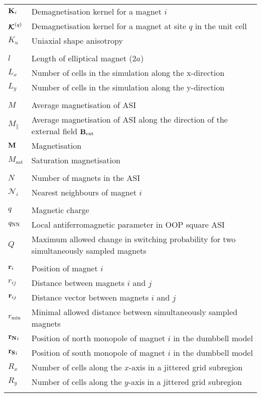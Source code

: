 \begin{longtable}[l]{p{60pt} p{350pt}}
	$\boldsymbol{\mathbf{K}}_i$ & Demagnetisation kernel for a magnet $i$ \\
	$\boldsymbol{\mathbf{\mathcal{K}}}^{(q)}$ & Demagnetisation kernel for a magnet at site $q$ in the unit cell \\
	$K_u$ & Uniaxial shape anisotropy \\
	&\\

	$l$ & Length of elliptical magnet ($2a$) \\
	$L_x$ & Number of cells in the simulation along the x-direction \\
	$L_y$ & Number of cells in the simulation along the y-direction \\
	&\\

	$M$ & Average magnetisation of ASI \\
	$M_\parallel$ & Average magnetisation of ASI along the direction of the external field $\boldsymbol{\mathbf{B}}_\mathrm{ext}$ \\
	$\boldsymbol{\mathbf{M}}$ & Magnetisation \\
	$M_\mathrm{sat}$ & Saturation magnetisation \\
	&\\

	$N$ & Number of magnets in the ASI \\ %
	$\mathcal{N}_i$ & Nearest neighbours of magnet $i$ \\
	&\\

	$q$ & Magnetic charge \\
	$q_\mathrm{NN}$ & Local antiferromagnetic parameter in OOP square ASI \\
	$Q$ & Maximum allowed change in switching probability for two simultaneously sampled magnets \\
	&\\

	$\boldsymbol{\mathbf{r}}_i$ & Position of magnet $i$ \\
	$r_{ij}$ & Distance between magnets $i$ and $j$ \\
	$\boldsymbol{\mathbf{r}}_{ij}$ & Distance vector between magnets $i$ and $j$ \\
	$r_\mathrm{min}$ & Minimal allowed distance between simultaneously sampled magnets \\
	$\boldsymbol{\mathbf{r_N}}_i$ & Position of north monopole of magnet $i$ in the dumbbell model \\
	$\boldsymbol{\mathbf{r_S}}_i$ & Position of south monopole of magnet $i$ in the dumbbell model \\
	$R_x$ & Number of cells along the $x$-axis in a jittered grid subregion \\
	$R_y$ & Number of cells along the $y$-axis in a jittered grid subregion \\
	&\\


\end{longtable}
